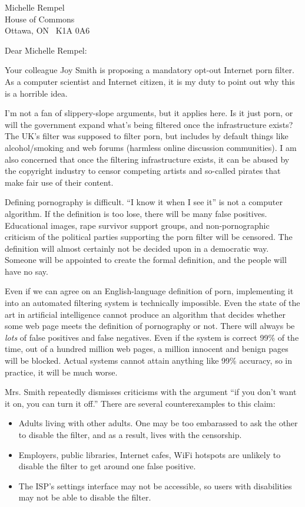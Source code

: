 \documentclass{letter}
\begin{document}
\begin{letter}{Michelle Rempel \\ House of Commons\\ Ottawa, ON \ K1A 0A6}
\opening{Dear Michelle Rempel:}

Your colleague Joy Smith is proposing a mandatory opt-out Internet porn filter.
As a computer scientist and Internet citizen, it is my duty to point out why
this is a horrible idea.

I'm not a fan of slippery-slope arguments, but it applies here. Is it just porn,
or will the government expand what's being filtered once the infrastructure
exists? The UK's filter was supposed to filter porn, but includes by default
things like alcohol/smoking and web forums (harmless online discussion
communities). I am also concerned that once the filtering infrastructure exists,
it can be abused by the copyright industry to censor competing artists and
so-called pirates that make fair use of their content.

Defining pornography is difficult. ``I know it when I see it'' is not a computer
algorithm. If the definition is too lose, there will be many false positives.
Educational images, rape survivor support groups, and non-pornographic criticism
of the political parties supporting the porn filter will be censored. The
definition will almost certainly not be decided upon in a democratic way.
Someone will be appointed to create the formal definition, and the people will
have no say.

Even if we can agree on an English-language definition of porn, implementing it
into an automated filtering system is technically impossible. Even the state of
the art in artificial intelligence cannot produce an algorithm that decides
whether some web page meets the definition of pornography or not. There will
always be \emph{lots} of false positives and false negatives. Even if the system
is correct 99\% of the time, out of a hundred million web pages, a million
innocent and benign pages will be blocked. Actual systems cannot attain anything
like 99\% accuracy, so in practice, it will be much worse.

Mrs. Smith repeatedly dismisses criticisms with the argument ``if you don't want
it on, you can turn it off.'' There are several counterexamples to this claim:

\begin{itemize}
    \item Adults living with other adults. One may be too embarassed to ask the
    other to disable the filter, and as a result, lives with the censorship.
    \item Employers, public libraries, Internet cafes, WiFi hotspots are
    unlikely to disable the filter to get around one false positive.
    \item The ISP's settings interface may not be accessible, so users with
    disabilities may not be able to disable the filter.
\end{itemize}


\end{letter}
\end{document}
